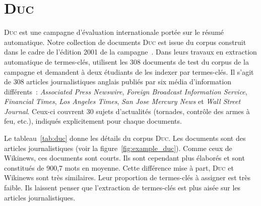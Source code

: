   \section[\textsc{Duc}]{\textsc{Duc}~\textnormal{\large\cite{wan2008expandrank}}}
  \label{sec:main-data_description-duc_data}
    \textsc{Duc} est une campagne d'évaluation internationale portée sur le
    résumé automatique. Notre collection de documents \textsc{Duc} est issue du
    corpus construit dans le cadre de l'édition 2001 de la
    campagne~\cite{over2001duc}. Dans leurs travaux en extraction automatique de
    termes-clés,  utilisent les 308 documents de test
    du corpus de la campagne et demandent à deux étudiants de les indexer par
    termes-clés. Il s'agit de 308 articles journalistiques  anglais publiés par
    six média d'information différents~: \textit{Associated Press Newswire},
    \textit{Foreign Broadcast Information Service}, \textit{Financial Times},
    \textit{Los Angeles Times}, \textit{San Jose Mercury News} et \textit{Wall
    Street Journal}. Ceux-ci couvrent 30 sujets d'actualités (tornades, contrôle
    des armes à feu, etc.), indiqués explicitement pour chaque documents.
    
    Le tableau~\ref{tab:duc} donne les détails du corpus \textsc{Duc}. Les
    documents sont des articles journalistiques (voir la
    figure~\ref{fig:example_duc}). Comme ceux de Wikinews, ces documents sont
    courts. Ils sont cependant plus élaborés et sont constitués de 900,7 mots en
    moyenne. Cette différence mise à part, \textsc{Duc} et Wikinews sont très
    similaires. Leur proportion de termes-clés à assigner est très faible. Ils
    laissent penser que l'extraction de termes-clés est plus aisée sur les
    articles journalistiques.

    \begin{table}[!h]
      \centering

      \caption{Corpus \textsc{Duc}
               \label{tab:duc}}
    \end{table}

